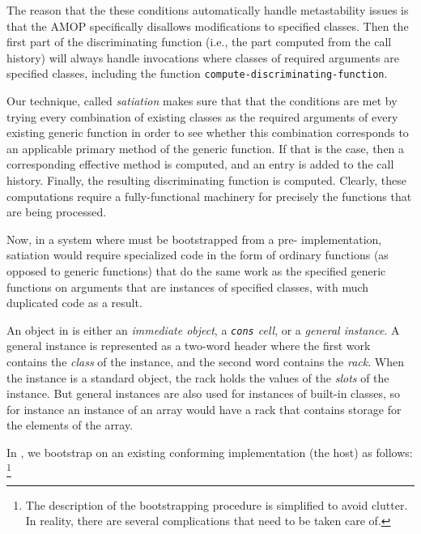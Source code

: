 The reason that the these conditions automatically handle
metastability issues is that the AMOP specifically disallows
modifications to specified classes.  Then the first part of the
discriminating function (i.e., the part computed from the call
history) will always handle invocations where classes of required
arguments are specified classes, including the function
\texttt{compute-discriminating-function}. 

Our technique, called \emph{satiation} makes sure that that the
conditions are met by trying every combination of existing classes as
the required arguments of every existing generic function in order to
see whether this combination corresponds to an applicable primary
method of the generic function.  If that is the case, then a
corresponding effective method is computed, and an entry is added to
the call history.  Finally, the resulting discriminating function is
computed.  Clearly, these computations require a fully-functional
machinery for precisely the functions that are being processed. 

Now, in a system where \clos{} must be bootstrapped from a pre-\clos{}
implementation, satiation would require specialized code in the form
of ordinary functions (as opposed to generic functions) that do the
same work as the specified generic functions on arguments that are
instances of specified classes, with much duplicated code as a result.

An object in \sicl{} is either an \emph{immediate object}, a
\emph{\texttt{cons} cell}, or a \emph{general instance}.  A general
instance is represented as a two-word header where the first work
contains the \emph{class} of the instance, and the second word
contains the \emph{rack}.  When the instance is a standard object, the
rack holds the values of the \emph{slots} of the instance.  But
general instances are also used for instances of built-in classes, so
for instance an instance of an array would have a rack that contains
storage for the elements of the array. 

In \sicl{}, we bootstrap \clos{} on an existing conforming \cl{}
implementation (the host) as follows:%
\footnote{The description of the bootstrapping procedure is simplified
  to avoid clutter.  In reality, there are several complications that
  need to be taken care of.}

